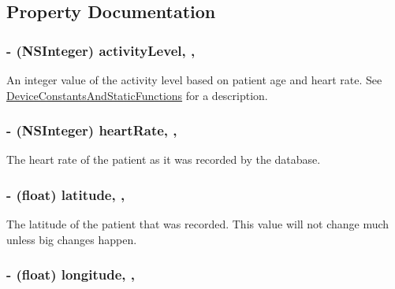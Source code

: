 \subsection{Property Documentation}
\hypertarget{interface_local_d_b_result_a10d275e102bd14b0a071b5572fbf62d3}{
\subsubsection[{activity\-Level}]{\setlength{\rightskip}{0pt plus 5cm}-\/ (N\-S\-Integer) activity\-Level\hspace{0.3cm}{\ttfamily [read]}, {\ttfamily [write]}, {\ttfamily [atomic]}}}\label{interface_local_d_b_result_a10d275e102bd14b0a071b5572fbf62d3}
An integer value of the activity level based on patient age and heart rate. See \hyperlink{class_device_constants_and_static_functions}{Device\-Constants\-And\-Static\-Functions} for a description. \hypertarget{interface_local_d_b_result_a59bb8d9536b92e3bbd6c244d13771ccc}{
\subsubsection[{heart\-Rate}]{\setlength{\rightskip}{0pt plus 5cm}-\/ (N\-S\-Integer) heart\-Rate\hspace{0.3cm}{\ttfamily [read]}, {\ttfamily [write]}, {\ttfamily [atomic]}}}\label{interface_local_d_b_result_a59bb8d9536b92e3bbd6c244d13771ccc}
The heart rate of the patient as it was recorded by the database. \hypertarget{interface_local_d_b_result_a55f83e49659fb4d15db30117f90dcea7}{
\subsubsection[{latitude}]{\setlength{\rightskip}{0pt plus 5cm}-\/ (float) latitude\hspace{0.3cm}{\ttfamily [read]}, {\ttfamily [write]}, {\ttfamily [atomic]}}}\label{interface_local_d_b_result_a55f83e49659fb4d15db30117f90dcea7}
The latitude of the patient that was recorded. This value will not change much unless big changes happen. \hypertarget{interface_local_d_b_result_ae50e0676b6cac4cad3e565c5caa117b2}{
\subsubsection[{longitude}]{\setlength{\rightskip}{0pt plus 5cm}-\/ (float) longitude\hspace{0.3cm}{\ttfamily [read]}, {\ttfamily [write]}, {\ttfamily [atomic]}}}\label{interface_local_d_b_result_ae50e0676b6cac4cad3e565c5caa117b2}
